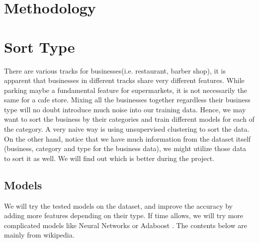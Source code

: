 \documentclass{article}
\begin{document}
\section{Methodology} 


\section{Sort Type}
There are various tracks for businesses(i.e. restaurant, barber shop), it is apparent that businesses in different tracks share very different features. While parking maybe a fundamental feature for supermarkets, it is not necessarily the same for a cafe store. Mixing all the businesses together regardless their business type will no doubt introduce much noise into our training data. Hence, we may want to sort the business by their categories and train different models for each of the category. A very naive way is using unsupervised clustering to sort the data. On the other hand, notice that we have much information from the dataset itself (business, category and type for the business data), we might utilize those data to sort it as well. We will find out which is better during the project.


\subsection{Models}

We will try the tested models on the dataset, and improve the accuracy by adding more features depending on their type. If time allows, we will try more complicated models like Neural Networks or Adaboost \cite{Andrew1}. The contents below are mainly from wikipedia. \cite{wiki}
\end{document}
